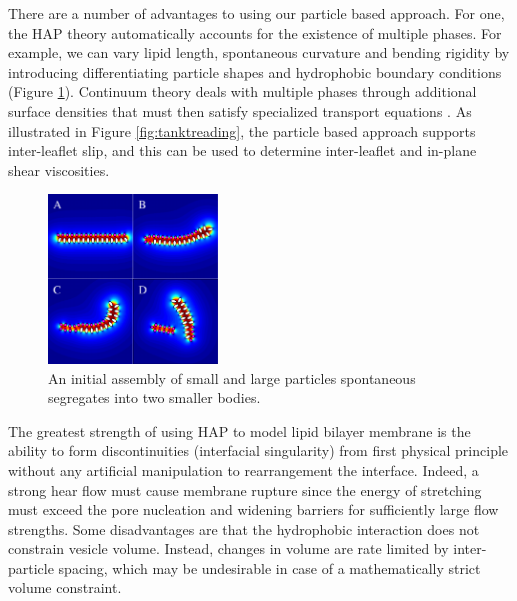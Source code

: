 There are a number of advantages to using our particle based approach.
For one, the HAP theory automatically accounts for the existence of multiple phases. 
For example, we can vary lipid length, spontaneous curvature and bending rigidity 
by introducing differentiating particle shapes and hydrophobic boundary conditions (Figure \ref{fig:demixing}).
Continuum theory deals with multiple phases through additional surface densities that must
then satisfy specialized transport equations \cite{Lowengrub07,MikuckiZhou17}. 
As illustrated in Figure \ref{fig:tanktreading}, the particle
based approach supports inter-leaflet slip, and this can be used to determine inter-leaflet
and in-plane shear viscosities. 
\begin{figure}
\centerline{\includegraphics[width=0.4\textwidth]{figures/PW_fig2.pdf}}
\caption{\label{fig:demixing} An initial assembly of small and 
large particles spontaneous segregates into two smaller bodies. }
\end{figure}
%



The greatest strength of using HAP to model lipid bilayer membrane is the ability
to form discontinuities (interfacial singularity) from first physical principle without any artificial manipulation to rearrangement the interface.
 Indeed, a strong hear flow must cause membrane rupture since the 
energy of stretching must exceed the pore nucleation and widening barriers 
for sufficiently large flow strengths. 
Some disadvantages are that the hydrophobic interaction does not constrain vesicle volume. 
Instead, changes in volume are rate limited by inter-particle spacing,
which may be undesirable in case of a mathematically strict volume constraint.

